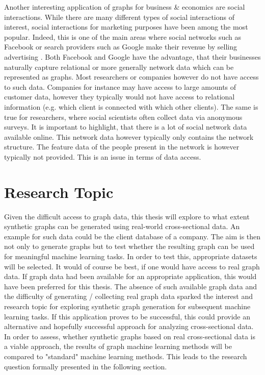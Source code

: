 	\noindent Another interesting application of graphs for business \& 
	economics are social interactions. While there are many different types of
	social interactions of interest, social interactions for marketing
	purposes have been among the most popular. Indeed, this is one of the main
	areas where social networks such as Facebook or search providers such as 
	Google make their revenue by selling advertising 
	\citep{Facebook2021,Alphabet2021}. Both Facebook and Google have the advantage, 
	that their businesses naturally capture relational or more generally network 
	data which can be represented as graphs. Most researchers or companies however 
	do not have access to such data. Companies for instance may have access to large
	amounts of customer data, however they typically would not have access to
	relational information (e.g. which client is connected with which other
	clients). The same is true for researchers, where social scientists
	often collect data via anonymous surveys. It is important to
	highlight, that there is a lot of social network data available online. 
	This network data however typically only contains the network structure. 
	The feature data of the people present in the network is however typically not
	provided. This is an issue in terms of data access. \\
	
	\section{Research Topic}

	\noindent Given the difficult access to graph data, this thesis will
	explore to what extent synthetic graphs can be generated using real-world
	cross-sectional data. An example for such data could be the client database
	of a company. The aim is then not only to generate graphs but to test 
	whether the resulting graph can be used for meaningful machine learning tasks. 
	In order to test this, appropriate datasets will be selected. It would of 
	course be best, if one would have access to real graph data. If graph data 
	had been available for an appropriate application, this would have been 
	preferred for this thesis. The absence of such available graph data and the 
	difficulty of generating / collecting real graph data sparked the interest 
	and research topic for exploring synthetic graph generation for subsequent 
	machine learning tasks. If this application proves to be successful, this 
	could provide an alternative and hopefully successful approach for analyzing 
	cross-sectional data. In order to assess, whether synthetic graphs based on real
	cross-sectional data is a viable approach, the results of graph machine
	learning methods will be compared to "standard" machine learning methods.
	This leads to the research question formally presented in the following
	section.

